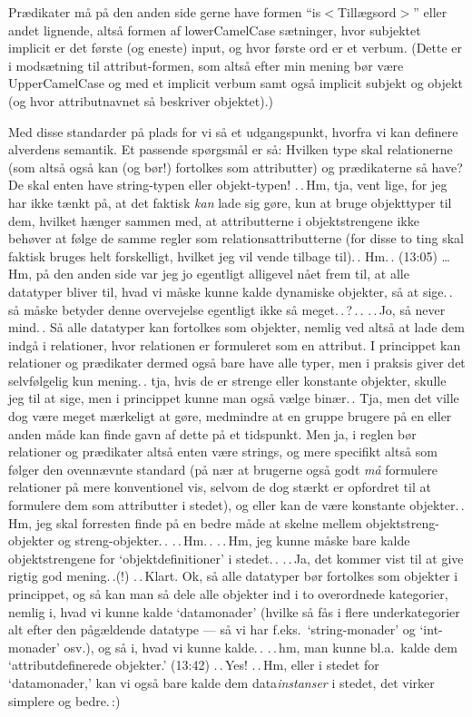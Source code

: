 \documentclass{report}
\begin{document}
Prædikater må på den anden side gerne have formen ``is$<$Tillægsord$>$'' eller andet lignende, altså formen af lowerCamelCase sætninger, hvor subjektet implicit er det første (og eneste) input, og hvor første ord er et verbum. (Dette er i modsætning til attribut-formen, som altså efter min mening bør være UpperCamelCase og med et implicit verbum samt også implicit subjekt og objekt (og hvor attributnavnet så beskriver objektet).) 

Med disse standarder på plads for vi så et udgangspunkt, hvorfra vi kan definere alverdens semantik. Et passende spørgsmål er så: Hvilken type skal relationerne (som altså også kan (og bør!) fortolkes som attributter) og prædikaterne så have? De skal enten have string-typen eller objekt-typen! .\,.\,Hm, tja, vent lige, for jeg har ikke tænkt på, at det faktisk \emph{kan} lade sig gøre, kun at bruge objekttyper til dem, hvilket hænger sammen med, at attributterne i objektstrengene ikke behøver at følge de samme regler som relationsattributterne (for disse to ting skal faktisk bruges helt forskelligt, hvilket jeg vil vende tilbage til).\,. Hm.\,. (13:05) \ldots Hm, på den anden side var jeg jo egentligt alligevel nået frem til, at alle datatyper bliver til, hvad vi måske kunne kalde dynamiske objekter, så at sige.\,. så måske betyder denne overvejelse egentligt ikke så meget.\,.\,?\,.\,. .\,.\,Jo, så never mind.\,. Så alle datatyper kan fortolkes som objekter, nemlig ved altså at lade dem indgå i relationer, hvor relationen er formuleret som en attribut. I princippet kan relationer og prædikater dermed også bare have alle typer, men i praksis giver det selvfølgelig kun mening.\,. tja, hvis de er strenge eller konstante objekter, skulle jeg til at sige, men i princippet kunne man også vælge binær.\,. Tja, men det ville dog være meget mærkeligt at gøre, medmindre at en gruppe brugere på en eller anden måde kan finde gavn af dette på et tidspunkt. Men ja, i reglen bør relationer og prædikater altså enten være strings, og mere specifikt altså som følger den ovennævnte standard (på nær at brugerne også godt \emph{må} formulere relationer på mere konventionel vis, selvom de dog stærkt er opfordret til at formulere dem som attributter i stedet), og eller kan de være konstante objekter.\,. Hm, jeg skal forresten finde på en bedre måde at skelne mellem objektstreng-objekter og streng-objekter.\,. .\,.\,Hm.\,. .\,.\,Hm, jeg kunne måske bare kalde objektstrengene for `objektdefinitioner' i stedet.\,. .\,.\,Ja, det kommer vist til at give rigtig god mening.\,.(!) .\,.\,Klart. Ok, så alle datatyper bør fortolkes som objekter i princippet, og så kan man så dele alle objekter ind i to overordnede kategorier, nemlig i, hvad vi kunne kalde `datamonader' (hvilke så fås i flere underkategorier alt efter den pågældende datatype --- så vi har f.eks.\ `string-monader' og `int-monader' osv.), og så i, hvad vi kunne kalde.\,. .\,.\,hm, man kunne bl.a.\ kalde dem `attributdefinerede objekter.' (13:42) .\,.\,Yes! .\,.\,Hm, eller i stedet for `datamonader,' kan vi også bare kalde dem data\emph{instanser} i stedet, det virker simplere og bedre.\,:) 
\end{document}
